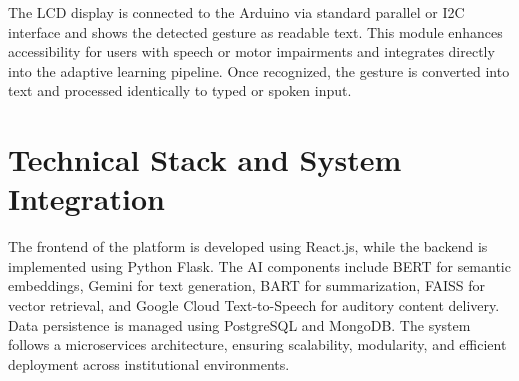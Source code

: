 The LCD display is connected to the Arduino via standard parallel or I2C interface and shows the detected gesture as readable text. This module enhances accessibility for users with speech or motor impairments and integrates directly into the adaptive learning pipeline. Once recognized, the gesture is converted into text and processed identically to typed or spoken input.

\section{Technical Stack and System Integration}
The frontend of the platform is developed using React.js, while the backend is implemented using Python Flask. The AI components include BERT for semantic embeddings, Gemini for text generation, BART for summarization, FAISS for vector retrieval, and Google Cloud Text-to-Speech for auditory content delivery. Data persistence is managed using PostgreSQL and MongoDB. The system follows a microservices architecture, ensuring scalability, modularity, and efficient deployment across institutional environments.